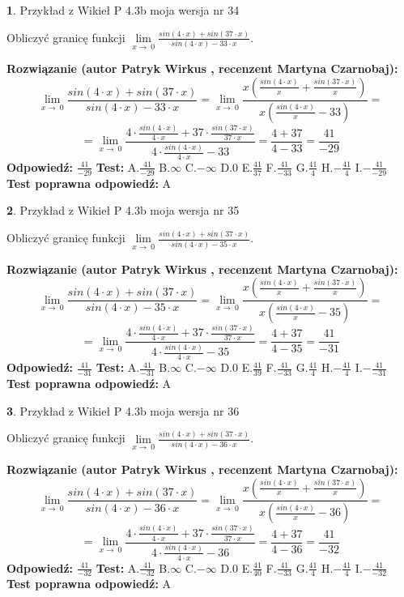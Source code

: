 \documentclass[12pt, a4paper]{article}
\theoremstyle{definition} %
\newtheorem{zad}{}
\newcommand{\zadStart}[1]{\begin{zad}#1\newline}
\newcommand{\zadStop}{\end{zad}}
\newcommand{\rozwStart}[2]{\noindent \textbf{Rozwiązanie (autor #1 , recenzent #2): }\newline}
\newcommand{\rozwStop}{\newline}
\newcommand{\odpStart}{\noindent \textbf{Odpowiedź:}\newline}
\newcommand{\odpStop}{\newline}
\newcommand{\testStart}{\noindent \textbf{Test:}\newline}
\newcommand{\testStop}{\newline}
\newcommand{\kluczStart}{\noindent \textbf{Test poprawna odpowiedź:}\newline}
\newcommand{\kluczStop}{\newline}
\begin{document}
\zadStart{Przykład z Wikieł P 4.3b moja wersja nr 34}


Obliczyć granicę funkcji $\lim\limits_{x\to\ 0}\frac{sin(4 \cdot x)+sin(37 \cdot x)}{sin(4 \cdot x)-33 \cdot x}$.
\zadStop
\rozwStart{Patryk Wirkus}{Martyna Czarnobaj}
$$\lim\limits_{x\to\ 0}\frac{sin(4 \cdot x)+sin(37 \cdot x)}{sin(4 \cdot x)-33 \cdot x}=\lim\limits_{x\to\ 0}\frac{x(\frac{sin(4 \cdot x)}{x}+\frac{sin(37 \cdot x)}{x})}{x(\frac{sin(4 \cdot x)}{x}-33)}=$$
$$=\lim\limits_{x\to\ 0}\frac{4 \cdot \frac{sin(4 \cdot x)}{4 \cdot x}+37 \cdot \frac{sin(37 \cdot x)}{37 \cdot x}}{4 \cdot \frac{sin(4 \cdot x)}{4 \cdot x}-33}=\frac{4+37}{4-33} = \frac{41}{-29}$$
\rozwStop
\odpStart
$\frac{41}{-29}$
\odpStop
\testStart
A.$\frac{41}{-29}$
B.$\infty$
C.$-\infty$
D.$0$
E.$\frac{41}{37}$
F.$\frac{41}{-33}$
G.$\frac{41}{4}$
H.$-\frac{41}{4}$
I.$-\frac{41}{-29}$
\testStop
\kluczStart
A
\kluczStop



\zadStart{Przykład z Wikieł P 4.3b moja wersja nr 35}


Obliczyć granicę funkcji $\lim\limits_{x\to\ 0}\frac{sin(4 \cdot x)+sin(37 \cdot x)}{sin(4 \cdot x)-35 \cdot x}$.
\zadStop
\rozwStart{Patryk Wirkus}{Martyna Czarnobaj}
$$\lim\limits_{x\to\ 0}\frac{sin(4 \cdot x)+sin(37 \cdot x)}{sin(4 \cdot x)-35 \cdot x}=\lim\limits_{x\to\ 0}\frac{x(\frac{sin(4 \cdot x)}{x}+\frac{sin(37 \cdot x)}{x})}{x(\frac{sin(4 \cdot x)}{x}-35)}=$$
$$=\lim\limits_{x\to\ 0}\frac{4 \cdot \frac{sin(4 \cdot x)}{4 \cdot x}+37 \cdot \frac{sin(37 \cdot x)}{37 \cdot x}}{4 \cdot \frac{sin(4 \cdot x)}{4 \cdot x}-35}=\frac{4+37}{4-35} = \frac{41}{-31}$$
\rozwStop
\odpStart
$\frac{41}{-31}$
\odpStop
\testStart
A.$\frac{41}{-31}$
B.$\infty$
C.$-\infty$
D.$0$
E.$\frac{41}{39}$
F.$\frac{41}{-33}$
G.$\frac{41}{4}$
H.$-\frac{41}{4}$
I.$-\frac{41}{-31}$
\testStop
\kluczStart
A
\kluczStop



\zadStart{Przykład z Wikieł P 4.3b moja wersja nr 36}


Obliczyć granicę funkcji $\lim\limits_{x\to\ 0}\frac{sin(4 \cdot x)+sin(37 \cdot x)}{sin(4 \cdot x)-36 \cdot x}$.
\zadStop
\rozwStart{Patryk Wirkus}{Martyna Czarnobaj}
$$\lim\limits_{x\to\ 0}\frac{sin(4 \cdot x)+sin(37 \cdot x)}{sin(4 \cdot x)-36 \cdot x}=\lim\limits_{x\to\ 0}\frac{x(\frac{sin(4 \cdot x)}{x}+\frac{sin(37 \cdot x)}{x})}{x(\frac{sin(4 \cdot x)}{x}-36)}=$$
$$=\lim\limits_{x\to\ 0}\frac{4 \cdot \frac{sin(4 \cdot x)}{4 \cdot x}+37 \cdot \frac{sin(37 \cdot x)}{37 \cdot x}}{4 \cdot \frac{sin(4 \cdot x)}{4 \cdot x}-36}=\frac{4+37}{4-36} = \frac{41}{-32}$$
\rozwStop
\odpStart
$\frac{41}{-32}$
\odpStop
\testStart
A.$\frac{41}{-32}$
B.$\infty$
C.$-\infty$
D.$0$
E.$\frac{41}{40}$
F.$\frac{41}{-33}$
G.$\frac{41}{4}$
H.$-\frac{41}{4}$
I.$-\frac{41}{-32}$
\testStop
\kluczStart
A
\kluczStop
\end{document}
